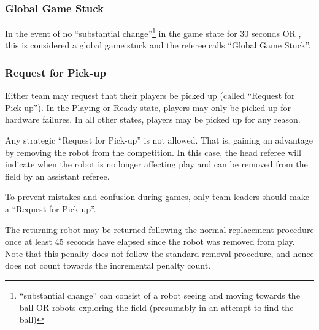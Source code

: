 \subsubsection{Global Game Stuck}
\label{sec:game_stuck:global}

In the event of no ``substantial change''\footnote{``substantial change'' can consist of a robot seeing and moving towards the ball OR robots exploring the field (presumably in an attempt to find the ball)} in the game state for 30 seconds OR , this is considered a global game stuck and the referee calls ``Global Game Stuck''. 



\subsubsection{Request for Pick-up}
\label{sec:request_for_pickup}

Either team may request that their players be picked up (called ``Request for Pick-up'').
In the Playing or Ready state, players may only be picked up for hardware failures.
In all other states, players may be picked up for any reason.



Any strategic ``Request for Pick-up'' is not allowed.
That is, gaining an advantage by removing the robot from the competition.
In this case, the head referee will indicate when the robot is no longer affecting play and can be removed from the field by an assistant referee.

To prevent mistakes and confusion during games, only team leaders should make a ``Request for Pick-up''.

The returning robot may be returned following the normal replacement procedure once at least 45 seconds have elapsed since the robot was removed from play. Note that this penalty does not follow the standard removal procedure, and hence does not count towards the incremental penalty count.

